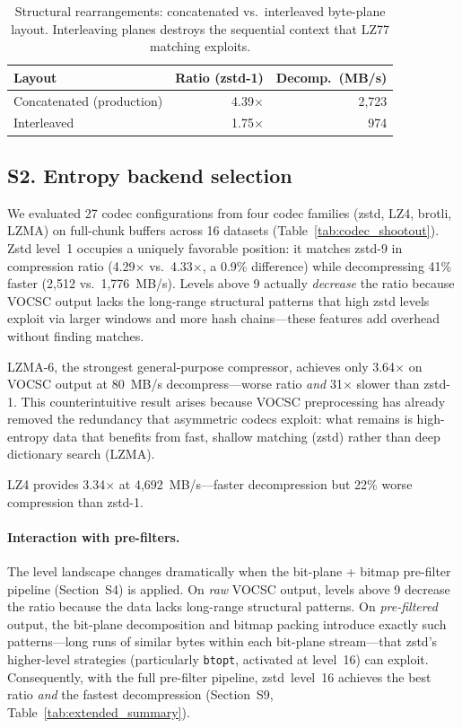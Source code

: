 \documentclass[10pt,twocolumn,letterpaper]{article}
\begin{document}
\begin{table}[h]
\centering
\caption{Structural rearrangements: concatenated vs.\ interleaved byte-plane layout. Interleaving planes destroys the sequential context that LZ77 matching exploits.}
\label{tab:structural}
\footnotesize
\begin{tabular}{lrr}
\toprule
Layout & Ratio (zstd-1) & Decomp.\ (MB/s) \\
\midrule
Concatenated (production) & 4.39$\times$ & 2{,}723 \\
Interleaved              & 1.75$\times$ & 974 \\
\bottomrule
\end{tabular}
\end{table}

\subsection*{S2. Entropy backend selection}

We evaluated 27 codec configurations from four codec families (zstd, LZ4, brotli, LZMA) on full-chunk buffers across 16 datasets (Table~\ref{tab:codec_shootout}).
Zstd level~1 occupies a uniquely favorable position: it matches zstd-9 in compression ratio (4.29$\times$ vs.\ 4.33$\times$, a 0.9\% difference) while decompressing 41\% faster (2{,}512 vs.\ 1{,}776~MB/s).
Levels above 9 actually \emph{decrease} the ratio because VOCSC output lacks the long-range structural patterns that high zstd levels exploit via larger windows and more hash chains---these features add overhead without finding matches.

LZMA-6, the strongest general-purpose compressor, achieves only 3.64$\times$ on VOCSC output at 80~MB/s decompress---worse ratio \emph{and} 31$\times$ slower than zstd-1.
This counterintuitive result arises because VOCSC preprocessing has already removed the redundancy that asymmetric codecs exploit: what remains is high-entropy data that benefits from fast, shallow matching (zstd) rather than deep dictionary search (LZMA).

LZ4 provides 3.34$\times$ at 4{,}692~MB/s---faster decompression but 22\% worse compression than zstd-1.

\paragraph{Interaction with pre-filters.}
The level landscape changes dramatically when the bit-plane + bitmap pre-filter pipeline (Section~S4) is applied.
On \emph{raw} VOCSC output, levels above 9 decrease the ratio because the data lacks long-range structural patterns.
On \emph{pre-filtered} output, the bit-plane decomposition and bitmap packing introduce exactly such patterns---long runs of similar bytes within each bit-plane stream---that zstd's higher-level strategies (particularly \texttt{btopt}, activated at level~16) can exploit.
Consequently, with the full pre-filter pipeline, zstd~level~16 achieves the best ratio \emph{and} the fastest decompression (Section~S9, Table~\ref{tab:extended_summary}).
\end{document}
